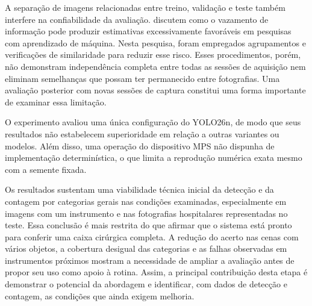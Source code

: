 A separação de imagens relacionadas entre treino, validação e teste também interfere na confiabilidade da avaliação. \textcite{kapoor2023} discutem como o vazamento de informação pode produzir estimativas excessivamente favoráveis em pesquisas com aprendizado de máquina. Nesta pesquisa, foram empregados agrupamentos e verificações de similaridade para reduzir esse risco. Esses procedimentos, porém, não demonstram independência completa entre todas as sessões de aquisição nem eliminam semelhanças que possam ter permanecido entre fotografias. Uma avaliação posterior com novas sessões de captura constitui uma forma importante de examinar essa limitação.

O experimento avaliou uma única configuração do YOLO26n, de modo que seus resultados não estabelecem superioridade em relação a outras variantes ou modelos. Além disso, uma operação do dispositivo MPS não dispunha de implementação determinística, o que limita a reprodução numérica exata mesmo com a semente fixada.

Os resultados sustentam uma viabilidade técnica inicial da detecção e da contagem por categorias gerais nas condições examinadas, especialmente em imagens com um instrumento e nas fotografias hospitalares representadas no teste. Essa conclusão é mais restrita do que afirmar que o sistema está pronto para conferir uma caixa cirúrgica completa. A redução do acerto nas cenas com vários objetos, a cobertura desigual das categorias e as falhas observadas em instrumentos próximos mostram a necessidade de ampliar a avaliação antes de propor seu uso como apoio à rotina. Assim, a principal contribuição desta etapa é demonstrar o potencial da abordagem e identificar, com dados de detecção e contagem, as condições que ainda exigem melhoria.

\endgroup
